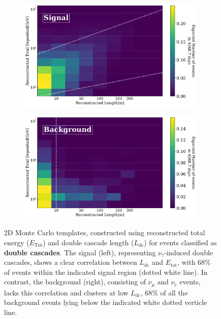\begin{figure}[h!]
    \begin{subfigure}[h]{0.72\textwidth}
        \includegraphics{./figures/Analysis/LvsE_signal.pdf}
    \end{subfigure}
    \hfill
    \begin{subfigure}[h]{0.72\textwidth}
        \includegraphics{./figures/Analysis/LvsE_Bkg.pdf}
       
    \end{subfigure}%
    \caption{2D Monte Carlo templates, constructed using reconstructed total energy ($E_{\text{Tot}}$) and double cascade length ($L_{\text{dc}}$) for events classified as \textbf{double cascades}. The signal (left), representing $\nu_\tau$-induced double cascades, shows a clear correlation between $L_{\text{dc}}$ and $E_{\text{tot}}$, with 68\% of events within the indicated signal region (dotted white line). In contrast, the background (right), consisting of $\nu_\mu$ and $\nu_e$ events, lacks this correlation and clusters at low $L_{\text{dc}}$, 68\% of all the background events lying below the indicated white dotted verticle line.}
\end{figure}

